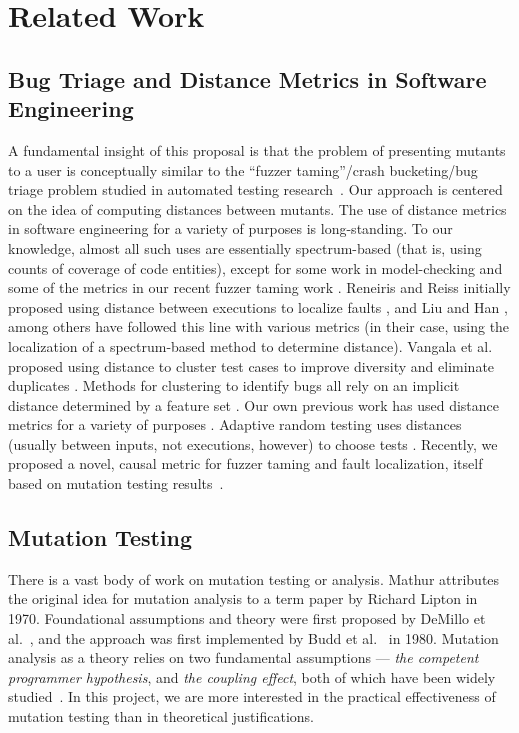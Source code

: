 \section{Related Work}

\subsection{Bug Triage and Distance Metrics in Software Engineering}

A fundamental insight of this proposal is that the problem of
presenting mutants to a user is conceptually similar to the ``fuzzer
taming''/crash bucketing/bug triage problem studied in automated
testing research~\cite{PLDI13,SemCrash}.  Our approach is centered on
the idea of computing distances between mutants.  The use of distance metrics in software engineering for a variety of
purposes is long-standing.  To our knowledge, almost all such uses are
essentially spectrum-based \cite{RepsSpectra} (that is, using counts
of coverage of code entities), except for some work in model-checking
\cite{GroceDist,ChakiLev} and some of the metrics in our recent fuzzer
taming work \cite{PLDI13}.  Reneiris and Reiss initially proposed
using distance between executions to localize faults
\cite{NearNeighbor}, and Liu and Han \cite{Liu06}, among others have
followed this line with various metrics (in their case, using the
localization of a spectrum-based method to determine distance).
Vangala et al. proposed using distance to cluster test cases to
improve diversity and eliminate duplicates \cite{VangalaDist}. Methods
for clustering to identify bugs all rely on an implicit distance
determined by a feature set \cite{Podgurski04}.  Our own previous work
has used distance metrics for a variety of purposes
\cite{PLDI13,icst2014,issta14}.  Adaptive random testing uses
distances (usually between inputs, not executions, however) to choose
tests \cite{Chen,ARTChen,ISSTAART}.  Recently, we proposed a novel,
causal metric for fuzzer taming and fault localization, itself based on
mutation testing results~\cite{distMut}.


\subsection{Mutation Testing}

There is a vast body of work on mutation testing or analysis.  Mathur attributes~\cite{mathur2012foundations} the original idea for mutation analysis
to a term paper by Richard Lipton in 1970. Foundational assumptions and
theory were first proposed by DeMillo et al.~\cite{demillo1978hints},
and the approach was first implemented by Budd et al.~\cite{budd1980theoretical} in 1980.
Mutation analysis as a theory relies on two fundamental
assumptions --- \emph{the competent programmer hypothesis},
and \emph{the coupling effect}, both of which have been widely
studied~\cite{wah2000atheoretical,wah2003ananalysis,gopinath2017the,offutt1989thecoupling,offutt1992investigations,langdon2010efficient,gopinath2017the,gopinath2014mutations}. In
this project, we are more interested in the practical effectiveness of
mutation testing than in theoretical justifications.

